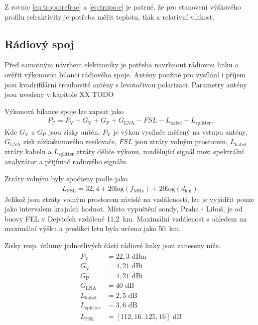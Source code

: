 \documentclass[twoside]{ctuthesis}
\newcommand{\mt}[1]{\text{#1}}
\theoremstyle{plain}
\theoremstyle{definition}
\theoremstyle{note}
\begin{document}
		Z rovnic \eqref{eq:tropo:refrac} a \eqref{eq:tropo:e} je patrné, že pro stanovení výškového profilu refraktivity je potřeba měřit teplotu, tlak a relativní vlhkost. 



		\subsection{Rádiový spoj}
		Před samotným návrhem elektroniky je potřeba navrhnout rádiovou linku a ověřit výkonovou bilanci rádiového spoje. Antény použité pro vysílání i příjem jsou kvadrifilární šroubovité antény s levotočivou polarizací. Parametry antény jsou uvedeny v kapitole XX TODO

		Výkonová bilance spoje lze zapsat jako
		\begin{align}
			P_\mt{P} = P_\mt{V} + G_\mt{V} + G_\mt{P} + G_\mt{LNA} - FSL - L_\mt{kabel} - L_\mt{splitter},
			\label{eq:bilance}
		\end{align}
		Kde $G_\mt{V}$ a $G_\mt{P}$ jsou zisky antén, $P_\mt{V}$ je výkon vysílače měřený na vstupu antény, $G_\mt{LNA}$ zisk nízkošumového zesilovače, $FSL$ jsou ztráty volným prostorem, $L_\mt{kabel}$ ztráty kabelu a $L_\mt{splitter}$ ztráty děliče výkonu, rozdělující signál mezi spektrální analyzátor a přijímač radiového signálu.

		Ztráty volným byly spočteny podle \cite{zaklady:sireni:vln} jako
		\begin{align}
			L_\mt{FSL} = 32,4 + 20\mt{log}(f_\mt{MHz}) + 20\mt{log}(d_\mt{km}).
		\end{align}
		Jelikož jsou ztráty volným prostorem závislé na vzdálenosti, lze je vyjádřit pouze jako intervalem krajních hodnot. Místo vypuštění sondy, Praha - Libuš, je od buovy FEL v Dejvicích vzdálené 11,2~km. Maximální vzdálenost s ohledem na maximální výšku a predikci letu byla určena jako 50~km.

		Zisky resp. útlumy jednotlivých částí rádiové linky jsou zaneseny níže.
		\begin{align*}
			\begin{split}
				P_\mt{V} &= 22{,}3\mt{ dBm}\\
				G_\mt{V} &= 4{,}21\mt{ dBi}\\
				G_\mt{P} &= 4{,}21\mt{ dBi}\\
				G_\mt{LNA} &= 40 \mt{ dB}\\
				L_\mt{kabel} &= 2{,}5\mt{ dB}\\
				L_\mt{splitter} &= 3{,}6\mt{ dB}\\
				L_\mt{FSL} &= [112{,}16 .. 125{,}16]\mt{ dB}
			\end{split}
		\end{align*}
\end{document}
